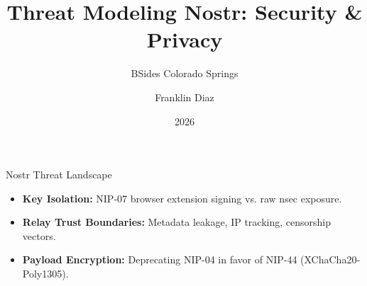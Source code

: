\documentclass[aspectratio=169]{beamer}
\title{Threat Modeling Nostr: Security \& Privacy}
\subtitle{BSides Colorado Springs}
\author{Franklin Diaz}
\date{2026}
\begin{document}
\frame{\titlepage}

\begin{frame}{Nostr Threat Landscape}
  \begin{itemize}
    \item \textbf{Key Isolation:} NIP-07 browser extension signing vs. raw nsec exposure.
    \item \textbf{Relay Trust Boundaries:} Metadata leakage, IP tracking, censorship vectors.
    \item \textbf{Payload Encryption:} Deprecating NIP-04 in favor of NIP-44 (XChaCha20-Poly1305).
  \end{itemize}
\end{frame}
\end{document}
